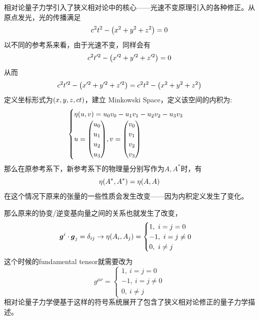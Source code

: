 \documentclass[12pt,a4paper,openany,twoside]{book}
\numberwithin{equation}{section}
\begin{document}
    相对论量子力学引入了狭义相对论中的核心——光速不变原理引入的各种修正。从原点发光，光的传播满足
    \begin{equation}
      c^2t^2-\qty(x^2+y^2+z^2)=0
    \end{equation}
    以不同的参考系来看，由于光速不变，同样会有
    \begin{equation}
      c^2t'^2-\qty(x'^2+y'^2+z'^2)=0
    \end{equation}
    从而
    \begin{equation}
      c^2t'^2-\qty(x'^2+y'^2+z'^2)=c^2t^2-\qty(x^2+y^2+z^2)
    \end{equation}
    定义坐标形式为$\qty(x,y,z,ct)$，建立 Minkowski Space，定义该空间的内积为:
    \begin{equation}
      \begin{cases}
        \eta\qty(u,v)=u_0v_0-u_1v_1-u_2 v_2-u_3v_3\\
        u=\mqty(
          u_0\\
          u_1\\
          u_2\\
          u_3
        ),
        v=\mqty(
          v_0\\
          v_1\\
          v_2\\
          v_3
        )
      \end{cases}
    \end{equation}
    那么在原参考系下，新参考系下的物理量分别写作为$A,A^*$时，有
    \begin{equation}
      \eta\qty(A^*,A^*)=\eta\qty(A,A)
    \end{equation}
    在这个情况下原来的张量的一些性质会发生改变——因为内积定义发生了变化。

    那么原来的协变/逆变基向量之间的关系也就发生了改变，
    \begin{equation}
      \vb*{g}^i\cdot\vb*{g}_j=\delta_{ij}\rightarrow\eta\qty(A_i,A_j)=
      \begin{cases}
        1,\ i=j=0\\
        -1,\ i=j\neq 0\\
        0,\ i\neq j
      \end{cases}
    \end{equation}
    这个时候的fundamental tensor就需要改为
    \begin{equation}
      g^{\mu\nu} =
      \begin{cases}
        1,\ i=j=0\\
        -1,\ i=j\neq 0\\
        0,\ i\neq j
      \end{cases}
    \end{equation}
    相对论量子力学便基于这样的符号系统展开了包含了狭义相对论修正的量子力学描述。
\end{document}
